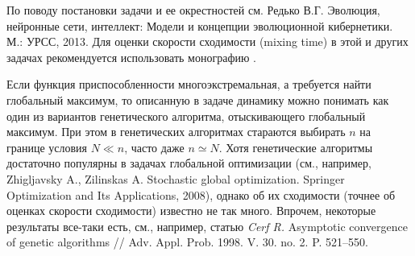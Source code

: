 \begin{remark}
По поводу постановки задачи и ее окрестностей см. 
{Редько В.Г.} Эволюция, нейронные сети, интеллект: Модели и концепции эволюционной 
кибернетики. М.: УРСС, 2013. Для оценки скорости сходимости (mixing time) в 
этой и других задачах рекомендуется использовать монографию \cite{240}.

Если функция 
приспособленности многоэкстремальная, а требуется найти глобальный максимум, 
то описанную в задаче динамику можно понимать как один из вариантов 
генетического алгоритма, отыскивающего глобальный максимум. При этом в 
генетических алгоритмах стараются выбирать $n$ на границе условия $N\ll n$, 
часто даже $n\simeq N$. Хотя генетические алгоритмы достаточно популярны в 
задачах глобальной оптимизации (см., например, Zhigljavsky A., Zilinskas A. Stochastic global 
optimization. Springer Optimization and Its Applications, 2008), однако об 
их сходимости (точнее об оценках скорости сходимости) известно не так много. 
Впрочем, некоторые результаты все-таки есть, см., например, статью \textit{Cerf R.} 
Asymptotic convergence of genetic algorithms // Adv. Appl. Prob. 1998. V. 
30. no. 2. P. 521--550. 
\end{remark}



